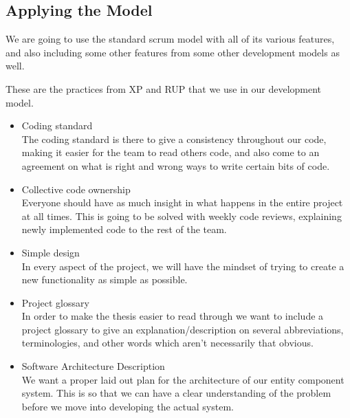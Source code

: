 \subsection{Applying the Model}
We are going to use the standard scrum model with all of its various features, and also including some other features from some other development models as well.

These are the practices from XP and RUP that we use in our development model. 
\begin{itemize}
    \item Coding standard\\
    The coding standard is there to give a consistency throughout our code, making it easier for the team to read others code, and also come to an agreement on what is right and wrong ways to write certain bits of code.

    \item Collective code ownership\\
    Everyone should have as much insight in what happens in the entire project at all times.
    This is going to be solved with weekly code reviews, 
    explaining newly implemented code to the rest of the team.

    \item Simple design\\
    In every aspect of the project, we will have the mindset of
    trying to create a new functionality as simple as possible. 

    \item Project glossary\\
    In order to make the thesis easier to read through we want to include a project
    glossary to give an explanation/description on several abbreviations,
    terminologies, and other words which aren't necessarily that obvious.

    \item Software Architecture Description\\
    We want a proper laid out plan for the architecture of our entity component system. 
    This is so that we can have a clear understanding of the problem before we move into developing the actual system.
    
\end{itemize}

